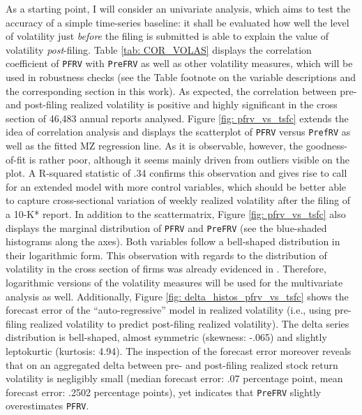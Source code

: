 As a starting point, I will consider an univariate analysis, which aims to test the accuracy of a simple time-series baseline: it shall be evaluated how well the level of volatility just \textit{before} the filing is submitted is able to explain the value of volatility \textit{post}-filing. Table \ref{tab: COR_VOLAS} displays the correlation coefficient of \texttt{PFRV} with \texttt{PreFRV} as well as other volatility measures, which will be used in robustness checks (see the Table footnote on the variable descriptions and the corresponding section in this work). As expected, the correlation between pre- and post-filing realized volatility is positive and highly significant in the cross section of 46,483 annual reports analysed. Figure \ref{fig: pfrv_vs_tsfc} extends the idea of correlation analysis and displays the scatterplot of \texttt{PFRV} versus \texttt{PrefRV} as well as the fitted MZ regression line. As it is observable, however, the goodness-of-fit is rather poor, although it seems mainly driven from outliers visible on the plot. A R-squared statistic of .34 confirms this observation and gives rise to call for an extended model with more control variables, which should be better able to capture cross-sectional variation of weekly realized volatility after the filing of a 10-K* report. In addition to the scattermatrix, Figure \ref{fig: pfrv_vs_tsfc} also displays the marginal distribution of \texttt{PFRV} and \texttt{PreFRV} (see the blue-shaded histograms along the axes). Both variables follow a bell-shaped distribution in their logarithmic form. This observation with regards to the distribution of volatility in the cross section of firms was already evidenced in \textcite{Kogan2009_1, TsaiWang2012, TsaiWang2013, TsaiWang2016}. Therefore, logarithmic versions of the volatility measures will be used for the multivariate analysis as well. 
Additionally, Figure \ref{fig: delta_histos_pfrv_vs_tsfc} shows the forecast error of the \enquote{auto-regressive} model in realized volatility (i.e., using pre-filing realized volatility to predict post-filing realized volatility). The delta series distribution is bell-shaped, almost symmetric (skewness: -.065) and slightly leptokurtic (kurtosis: 4.94). The inspection of the forecast error moreover reveals that on an aggregated delta between pre- and post-filing realized stock return volatility is negligibly small (median forecast error: .07 percentage point, mean forecast error:  .2502 percentage points), yet indicates that \texttt{PreFRV} slightly overestimates \texttt{PFRV}. 

